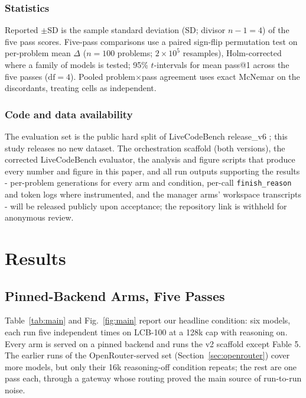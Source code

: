 \documentclass[journal]{IEEEtran}
\begin{document}
\subsubsection{Statistics} Reported $\pm$SD is the sample standard deviation (SD; divisor $n-1 = 4$) of the five
pass scores. Five-pass comparisons use a paired sign-flip permutation test on per-problem
mean $\Delta$ ($n = 100$ problems; $2\times10^{5}$ resamples), Holm-corrected where a family
of models is tested; 95\% $t$-intervals for mean pass@1 across the five passes
($\mathrm{df} = 4$). Pooled problem$\times$pass agreement uses exact McNemar on the
discordants, treating cells as independent.

\subsubsection{Code and data availability} The evaluation set is the public hard split of
LiveCodeBench release\_v6 \cite{jain2024}; this study releases no new dataset. The orchestration
scaffold (both versions), the corrected LiveCodeBench evaluator, the analysis and figure scripts
that produce every number and figure in this paper, and all run outputs supporting the
results - per-problem generations for every arm and condition, per-call \texttt{finish\_reason}
and token logs where instrumented, and the manager arms' workspace transcripts - will be released publicly upon acceptance; the
repository link is withheld for anonymous review.

\section{Results}
\label{sec:results}

\subsection{Pinned-Backend Arms, Five Passes}
\label{sec:pinned}





Table~\ref{tab:main} and Fig.~\ref{fig:main} report our headline condition: six models, each run five independent times on LCB-100 at a 128k
cap with reasoning on. Every arm is served on a pinned backend and runs the v2 scaffold except Fable 5. The
earlier runs of the OpenRouter-served set (Section~\ref{sec:openrouter}) cover more models,
but only their 16k reasoning-off condition repeats; the rest are one pass each, through a
gateway whose routing proved the main source of run-to-run noise.
\end{document}
